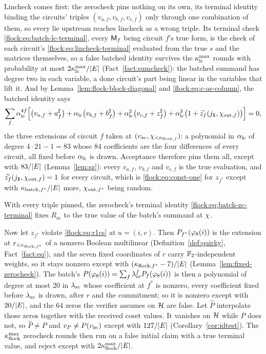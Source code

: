 Lincheck comes first: the zerocheck pins nothing on its own, its terminal identity binding the circuits' triples $(v_{a,f},v_{b,f},v_{c,f})$ only through one combination of them, so every lie upstream reaches lincheck as a wrong triple. Its terminal check \eqref{flock:eq:batch-lc-terminal}, every $\mathsf{M}_{f}$ being circuit $f$'s true form, is the check of each circuit's \eqref{flock:eq:lincheck-terminal} evaluated from the true $s$ and the matrices themselves, so a false batched identity survives the $\kappa_{\mathrm{lc}}^{\max}$ rounds with probability at most $2\kappa_{\mathrm{lc}}^{\max}/|E|$ (Fact~\ref{fact:sumcheck}): the batched summand has degree two in each variable, a done circuit's part being linear in the variables that lift it. And by Lemma~\ref{lem:flock-block-diagonal} and \eqref{flock:eq:c-as-column}, the batched identity says
\[
\sum_f\alpha_{\mathrm{lc}}^{4f}\Bigl[\bigl(v_{a,f}+a^{\sharp}_f\bigr)+\alpha_{\mathrm{lc}}\bigl(v_{b,f}+b^{\sharp}_f\bigr)+\alpha_{\mathrm{lc}}^2\bigl(v_{c,f}+z^{\sharp}_f\bigr)+\alpha_{\mathrm{lc}}^3\bigl(1+\widetilde{z_f}(j_{\mathbf{1}},\chi_{\mathrm{out},f})\bigr)\Bigr]=0,
\]
the three extensions of circuit $f$ taken at $(\upsilon_{\mathrm{zc}},\chi_{<\kappa_{\mathrm{flock},f}})$: a polynomial in $\alpha_{\mathrm{lc}}$ of degree $4\cdot21-1=83$ whose $84$ coefficients are the four differences of every circuit, all fixed before $\alpha_{\mathrm{lc}}$ is drawn. Acceptance therefore pins them all, except with $83/|E|$ (Lemma~\ref{lem:sz}): every $v_{a,f}$, $v_{b,f}$ and $v_{c,f}$ is the true evaluation, and $\widetilde{z_f}(j_{\mathbf{1}},\chi_{\mathrm{out},f})=1$ for every circuit, which is \eqref{flock:eq:const-one} for $z_{f^\ast}$ except with $\kappa_{\mathrm{batch},f^\ast}/|E|$ more, $\chi_{\mathrm{out},f^\ast}$ being random.

With every triple pinned, the zerocheck's terminal identity \eqref{flock:eq:batch-zc-terminal} fixes $R_{\mathrm{zc}}$ to the true value of the batch's summand at $\chi$.

Now let $z_{f^\ast}$ violate \eqref{flock:eq:r1cs} at $u=(i,v)$. Then $P_{f^\ast}(\varphi_{8}(i))$ is the extension at $r_{<\kappa_{\mathrm{flock},f^\ast}}$ of a nonzero Boolean multilinear (Definition~\ref{def:quirky}, Fact~\ref{fact:eq}), and the seven fixed coordinates of $r$ carry $\mathbb{F}_2$-independent weights, so it stays nonzero except with $(\kappa_{\mathrm{flock},f^\ast}-7)/|E|$ (Lemma~\ref{lem:fixed-zerocheck}). The batch's $P(\varphi_{8}(i))=\sum_f\lambda_{\mathrm{zc}}^fP_f(\varphi_{8}(i))$ is then a polynomial of degree at most $20$ in $\lambda_{\mathrm{zc}}$ whose coefficient at $f^\ast$ is nonzero, every coefficient fixed before $\lambda_{\mathrm{zc}}$ is drawn, after $r$ and the commitment; so it is nonzero except with $20/|E|$, and the $64$ zeros the verifier assumes on $\mathcal{H}$ are false. Let $\hat P$ interpolate those zeros together with the received coset values. It vanishes on $\mathcal{H}$ while $P$ does not, so $\hat P\neq P$ and $v_P\neq P(\upsilon_{\mathrm{zc}})$ except with $127/|E|$ (Corollary~\ref{cor:idtest}). The $\kappa_{\mathrm{flock}}^{\max}$ zerocheck rounds then run on a false initial claim with a true terminal value, and reject except with $2\kappa_{\mathrm{flock}}^{\max}/|E|$.

